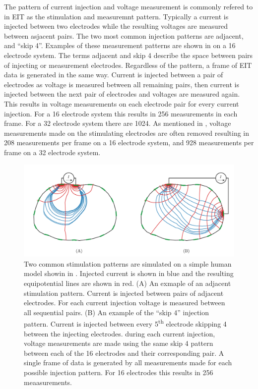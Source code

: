 The pattern of current injection and voltage measurement is commonly refered to in EIT 
as the stimulation and measuremnt pattern. Typically a current is injected between two electrodes
while the resulting voltages are measured between asjacent pairs. The two most common injection 
patterns are adjacent, and ``skip 4''. Examples of these measurement patterns are shown in 
 on a 16 electrode system. The terms adjacent and skip 4 describe 
the space between pairs of injecting or measurement electrodes. 
Regardless of the pattern, a frame of EIT data is generated in the same way. 
Current is injected between a pair of electrodes as voltage is measured between all 
remaining pairs, then current is injected between the next pair of electrodes and
voltages are measured again. This results in voltage measurements on each electrode 
pair for every current injection. For a 16 electrode system this results in 
256 measurements in each frame. For a 32 electrode system there are 1024. As mentioned in 
, voltage measurements made on the stimulating electrodes
are often removed resulting in 208 measurements per frame on a 16
electrode system, and 928 measurements per frame on a 32 electrode system.  

\begin{figure}
    \includegraphics[width=\textwidth]{chapter2-background/imgs/common_stim_meas_patterns.pdf}
    \caption[Adjacent and "skip 4" stimulation patterns]{\label{fig:stim_meas_bkgnd} 
    Two common stimulation patterns are simulated on a simple human model showin in 
    . Injected current is shown in blue and the resulting equipotential 
    lines are shown in red.
    (A) An exmaple of an adjacent stimulation pattern. Current is injected between 
    pairs of adjacent electrodes. For each current injection voltage is 
    measured between all sequential pairs. 
    (B) An example of the ``skip 4'' injection pattern. Current is injected between every
    5\textsuperscript{th} electrode skipping 4 between the injecting electrodes. 
    during each current injection, voltage measurements are made using the same skip 4 
    pattern between each of the 16 electrodes and their corresponding pair. 
    A single frame of data is generated by all measurements made for each possible injection
    pattern. For 16 electrodes this results in 256 meaasurements.}
\end{figure}

